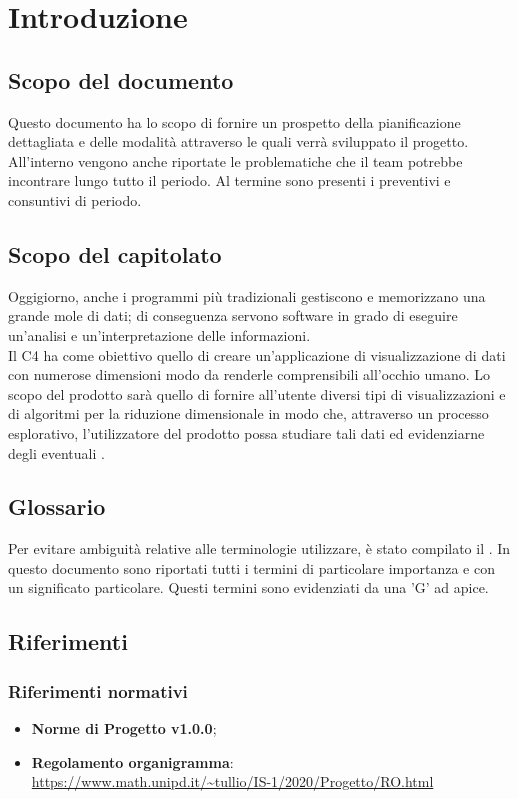 \section{Introduzione}

\subsection{Scopo del documento}
Questo documento ha lo scopo di fornire un prospetto della pianificazione dettagliata e delle modalità attraverso le quali verrà sviluppato il progetto. All'interno vengono anche riportate le problematiche che il team potrebbe incontrare lungo tutto il periodo. Al termine sono presenti i preventivi e consuntivi di periodo.

\subsection{Scopo del capitolato}
Oggigiorno, anche i programmi più tradizionali gestiscono e memorizzano una grande mole di dati; di conseguenza servono software in grado di eseguire un'analisi e un'interpretazione delle informazioni.\\
Il  C4 ha come obiettivo quello di creare un'applicazione di visualizzazione di dati con numerose dimensioni modo da renderle comprensibili all'occhio umano.  Lo scopo del prodotto sarà quello di fornire all'utente diversi tipi di visualizzazioni e di algoritmi per la riduzione dimensionale in modo che, attraverso un processo esplorativo, l'utilizzatore del prodotto possa studiare tali dati ed evidenziarne degli eventuali . 

\subsection{Glossario}
Per evitare ambiguità relative alle terminologie utilizzare, è stato compilato il . In questo documento sono riportati tutti i termini di particolare importanza e con un significato particolare. Questi termini sono evidenziati da una 'G' ad apice.

\subsection{Riferimenti}
\subsubsection{Riferimenti normativi}
\begin{itemize}	
	\item \textbf{Norme di Progetto v1.0.0};
	
	\item \textbf{Regolamento organigramma}:\\
	\textcolor{blue}{\url{https://www.math.unipd.it/~tullio/IS-1/2020/Progetto/RO.html}}
\end{itemize}

